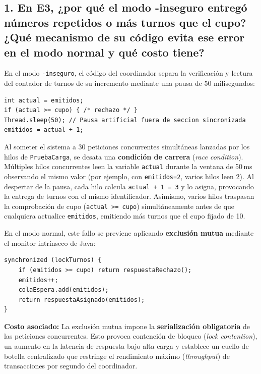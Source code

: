 \documentclass[10pt,a4paper]{article}
\begin{document}
\subsection*{1. En E3, ¿por qué el modo -inseguro entregó números repetidos o más turnos que el cupo? ¿Qué mecanismo de su código evita ese error en el modo normal y qué costo tiene?}
En el modo \texttt{-inseguro}, el código del coordinador separa la verificación y lectura del contador de turnos de su incremento mediante una pausa de 50 milisegundos:
\vspace{-0.1cm}
{\footnotesize
\begin{verbatim}
int actual = emitidos;
if (actual >= cupo) { /* rechazo */ }
Thread.sleep(50); // Pausa artificial fuera de seccion sincronizada
emitidos = actual + 1;
\end{verbatim}
}
\vspace{-0.15cm}
Al someter el sistema a 30 peticiones concurrentes simultáneas lanzadas por los hilos de \texttt{PruebaCarga}, se desata una \textbf{condición de carrera} (\textit{race condition}). Múltiples hilos concurrentes leen la variable \texttt{actual} durante la ventana de 50\,ms observando el mismo valor (por ejemplo, con \texttt{emitidos=2}, varios hilos leen 2). Al despertar de la pausa, cada hilo calcula \texttt{actual + 1 = 3} y lo asigna, provocando la entrega de turnos con el mismo identificador. Asimismo, varios hilos traspasan la comprobación de cupo (\texttt{actual >= cupo}) simultáneamente antes de que cualquiera actualice \texttt{emitidos}, emitiendo más turnos que el cupo fijado de 10.

En el modo normal, este fallo se previene aplicando \textbf{exclusión mutua} mediante el monitor intrínseco de Java:
\vspace{-0.1cm}
{\footnotesize
\begin{verbatim}
synchronized (lockTurnos) {
    if (emitidos >= cupo) return respuestaRechazo();
    emitidos++;
    colaEspera.add(emitidos);
    return respuestaAsignado(emitidos);
}
\end{verbatim}
}
\vspace{-0.15cm}
\textbf{Costo asociado:} La exclusión mutua impone la \textbf{serialización obligatoria} de las peticiones concurrentes. Esto provoca contención de bloqueo (\textit{lock contention}), un aumento en la latencia de respuesta bajo alta carga y establece un cuello de botella centralizado que restringe el rendimiento máximo (\textit{throughput}) de transacciones por segundo del coordinador.
\end{document}
